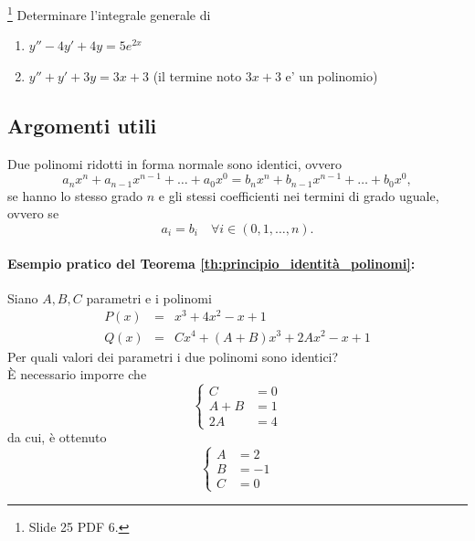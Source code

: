 \begin{exercise}\footnote{Slide 25 PDF 6.}
	Determinare l'integrale generale di
	\begin{enumerate}
		\item $y'' - 4y' + 4y = 5 e^{2x}$
		\item $y'' + y' + 3y = 3x + 3$ (il termine noto $3x + 3$ e' un polinomio)
	\end{enumerate}
\end{exercise}


\subsection{Argomenti utili}
\begin{theorem}\label{th:principio_identità_polinomi}
		Due polinomi ridotti in forma normale sono identici, ovvero
		\begin{equation*}
			a_nx^n+a_{n-1}x^{n-1}+\hdots+a_0x^0 = b_nx^n+b_{n-1}x^{n-1}+\hdots+b_0x^0,
		\end{equation*}
		se hanno lo stesso grado $n$ e gli stessi coefficienti nei termini di grado uguale, ovvero se
		\begin{equation*}
			a_i=b_i\quad\forall i\in(0,1,\hdots, n).
		\end{equation*}
\end{theorem}
\paragraph{Esempio pratico del Teorema \ref{th:principio_identità_polinomi}:} Siano $A,B,C$ parametri e i \gls{polinomi}
\begin{equation*}
	\begin{matrix}
		P(x) &=& x^3 + 4x^2-x+1\\
		Q(x) &=& Cx^4 + (A+B)x^3+2Ax^2-x+1
	\end{matrix}
\end{equation*}
Per quali valori dei parametri i due polinomi sono identici?\\
È necessario imporre che
\begin{equation*}
	\begin{cases}
		C&=0\\
		A+B &= 1\\
		2A &= 4
	\end{cases}
\end{equation*}
da cui, è ottenuto
\begin{equation*}
	\begin{cases}
		A &= 2\\
		B &= - 1\\
		C&=0
	\end{cases}
\end{equation*}


